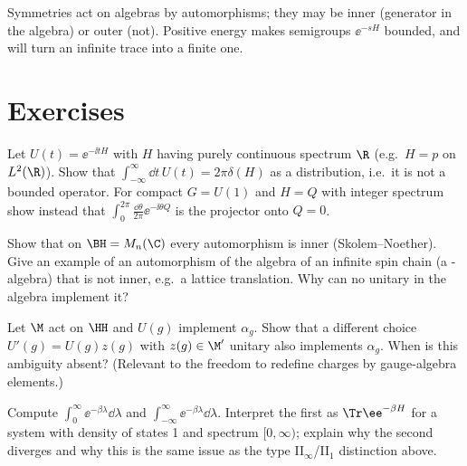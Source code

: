 \begin{keyidea}
Symmetries act on algebras by automorphisms; they may be inner (generator in the algebra) or outer (not). Positive energy makes semigroups $\ee^{-sH}$ bounded, and will turn an infinite trace into a finite one.
\end{keyidea}

\section*{Exercises}
\begin{exercise}
Let $U(t)=\ee^{-\ii tH}$ with $H$ having purely continuous spectrum $\R$ (e.g.\ $H=p$ on $L^2(\R)$). Show that $\int_{-\infty}^\infty\dd t\,U(t)=2\pi\delta(H)$ as a distribution, i.e.\ it is not a bounded operator. For compact $G=U(1)$ and $H=Q$ with integer spectrum show instead that $\int_0^{2\pi}\frac{\dd\theta}{2\pi}\ee^{-\ii\theta Q}$ is the projector onto $Q=0$.
\end{exercise}
\begin{exercise}
Show that on $\BH=M_n(\C)$ every automorphism is inner (Skolem--Noether). Give an example of an automorphism of the algebra of an infinite spin chain (a \cstar-algebra) that is not inner, e.g.\ a lattice translation. Why can no unitary in the algebra implement it?
\end{exercise}
\begin{exercise}
Let $\M$ act on $\HH$ and $U(g)$ implement $\alpha_g$. Show that a different choice $U'(g)=U(g)z(g)$ with $z(g)\in\M'$ unitary also implements $\alpha_g$. When is this ambiguity absent? (Relevant to the freedom to redefine charges by gauge-algebra elements.)
\end{exercise}
\begin{exercise}
Compute $\int_0^\infty\ee^{-\beta\lambda}\dd\lambda$ and $\int_{-\infty}^{\infty}\ee^{-\beta\lambda}\dd\lambda$. Interpret the first as $\Tr\ee^{-\beta H}$ for a system with density of states 1 and spectrum $[0,\infty)$; explain why the second diverges and why this is the same issue as the type II$_\infty$/II$_1$ distinction above.
\end{exercise}
